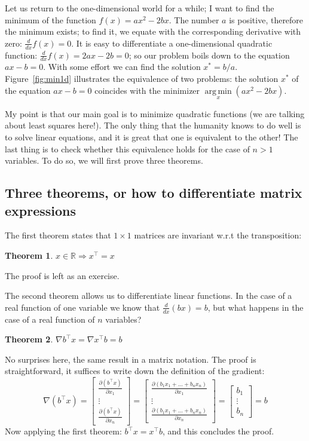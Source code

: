 \documentclass[notitlepage]{report}
\DeclareMathOperator*{\argmin}{arg\,min}
\newtheorem{theorem}{Theorem}
\begin{document}
Let us return to the one-dimensional world for a while; I want to find the minimum of the function $f(x) = ax^2 - 2bx$. 
The number $a$ is positive, therefore the minimum exists; to find it, we equate with the corresponding derivative with zero: $\frac{d}{dx}f(x) = 0$. 
It is easy to differentiate a one-dimensional quadratic function: $\frac{d}{dx}f(x) = 2ax - 2b = 0$; so our problem boils down to the equation $ax-b=0$.
With some effort we can find the solution $x^* = b/a$. Figure~\ref{fig:min1d} illustrates the equivalence of two problems:
the solution $x^*$ of the equation $ax-b=0$ coincides with the minimizer $\argmin\limits_x(ax^2 - 2bx)$.

My point is that our main goal is to minimize quadratic functions (we are talking about least squares here!).
The only thing that the humanity knows to do well is to solve linear equations, and it is great that one is equivalent to the other!
The last thing is to check whether this equivalence holds for the case of $n>1$ variables.
To do so, we will first prove three theorems.

\subsection{Three theorems, or how to differentiate matrix expressions}
The first theorem states that $1\times 1$ matrices are invariant w.r.t the transposition:
\begin{theorem}
$x\in \mathbb R \Rightarrow x^\top = x$
\end{theorem}
The proof is left as an exercise.

The second theorem allows us to differentiate linear functions. In the case of a real function of one variable we know that
$\frac{d}{dx}(bx) = b$, but what happens in the case of a real function of $n$ variables?
\begin{theorem}
$\nabla b^\top x = \nabla x^\top b = b$
\end{theorem}
No surprises here, the same result in a matrix notation. The proof is straightforward, it suffices to write down the definition of the gradient:
$$\nabla(b^\top x) = \begin{bmatrix}\frac{\partial (b^\top x)}{\partial x_1} \\ \vdots \\ \frac{\partial (b^\top x)}{\partial x_n} \end{bmatrix} = \begin{bmatrix}\frac{\partial (b_1 x_1 + \dots + b_n x_n)}{\partial x_1} \\ \vdots \\ \frac{\partial (b_1 x_1 + \dots + b_n x_n)}{\partial x_n} \end{bmatrix}
= \begin{bmatrix}b_1 \\ \vdots \\ b_n \end{bmatrix} = b$$
Now applying the first theorem: $b^\top x = x^\top b$, and this concludes the proof.
\end{document}
